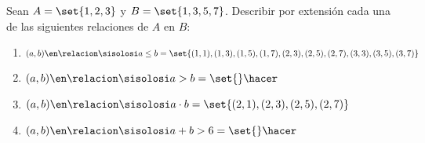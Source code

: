 \ejercicio Sean $A = \set{1, 2, 3}$ y $B = \set{1, 3, 5, 7}$. Describir por extensión cada una de las
siguientes relaciones de $A$ en $B$:
\begin{enumerate}[label=\roman*)]
	\item $(a,b) \en \relacion \sisolosi a\leq b =\\
		      \set{(1,1), (1,3), (1,5), (1,7), (2,3), (2,5), (2,7), (3,3), (3,5), (3,7)}$

	\item $(a,b) \en \relacion \sisolosi a > b = \set{}\hacer$

	\item $(a,b) \en \relacion \sisolosi a \cdot b = \set{(2,1), (2,3), (2,5), (2,7)}$

	\item $(a,b) \en \relacion \sisolosi a + b > 6 = \set{}\hacer$
\end{enumerate}
